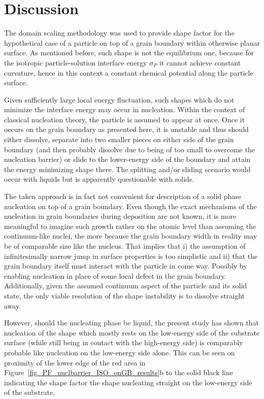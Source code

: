 \section{Discussion}
The domain scaling methodology was used to provide shape factor for the hypothetical case of a particle on top of a grain boundary within otherwise planar surface. As mentioned before, such shape is not the equilibrium one, because for the isotropic particle-solution interface energy $\sigma_P$ it cannot achieve constant curvature, hence in this context a constant chemical potential along the particle surface. 

Given sufficiently large local energy fluctuation, such shapes which do not minimize the interface energy may occur in nucleation. Within the context of classical nucleation theory, the particle is assumed to appear at once. Once it occurs on the grain boundary as presented here, it is unstable and thus should either dissolve, separate into two smaller pieces on either side of the grain boundary (and then probably dissolve due to being of too small to overcome the nucleation barrier) or slide to the lower-energy side of the boundary and attain the energy minimizing shape there. The splitting and/or sliding scenario would occur with liquids but is apparently questionable with solids.

The taken approach is in fact not convenient for description of a solid phase nucleation on top of a grain boundary. Even though the exact mechanisms of the nucleation in grain boundaries during deposition are not known, it is more meaningful to imagine such growth rather on the atomic level than assuming the continuum-like nuclei, the more because the grain boundary width in reality may be of comparable size like the nucleus. That implies that i) the assumption of infinitesimally narrow jump in surface properties is too simplistic and ii) that the grain boundary itself must interact with the particle in come way. Possibly by enabling nucleation in place of some local defect in the grain boundary. Additionally, given the assumed continuum aspect of the particle and its solid state, the only viable resolution of the shape instability is to dissolve straight away.

However, should the nucleating phase be liquid, the present study has shown that nucleation of the shape which mostly rests on the low-energy side of the substrate surface (while still being in contact with the high-energy side) is comparably probable like nucleation on the low-energy side alone. This can be seen on proximity of the lower edge of the red area in Figure~\ref{fig_PF_nuclbarrier_ISO_onGB_results}b to the solid black line indicating the shape factor the shape nucleating straight on the low-energy side of the substrate. 

